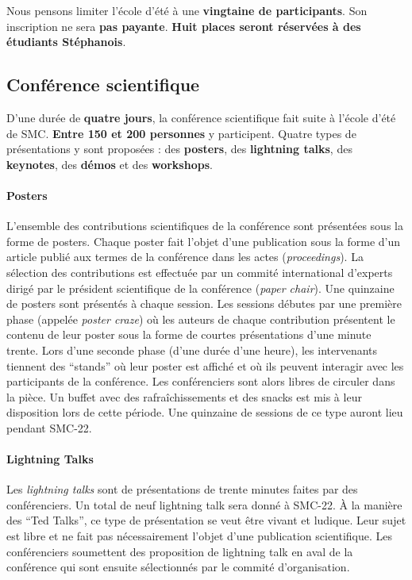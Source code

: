 \documentclass[fontsize=12pt]{scrartcl} %
\numberwithin{equation}{section} %
\numberwithin{figure}{section} %
\numberwithin{table}{section} %
\begin{document}
Nous pensons limiter l'école d'été à une \textbf{vingtaine de participants}. Son inscription ne sera \textbf{pas payante}. \textbf{Huit places seront réservées à des étudiants Stéphanois}. 

\subsection{Conférence scientifique}

D'une durée de \textbf{quatre jours}, la conférence scientifique fait suite à l'école d'été de SMC. \textbf{Entre 150 et 200 personnes} y participent. Quatre types de présentations y sont proposées : des \textbf{posters}, des \textbf{lightning talks}, des \textbf{keynotes}, des \textbf{démos} et des \textbf{workshops}. 

\paragraph{\textbf{Posters}} L'ensemble des contributions scientifiques de la conférence sont présentées sous la forme de posters. Chaque poster fait l'objet d'une publication sous la forme d'un article publié aux termes de la conférence dans les actes (\textit{proceedings}). La sélection des contributions est effectuée par un commité international d'experts dirigé par le président scientifique de la conférence (\textit{paper chair}). Une quinzaine de posters sont présentés à chaque session. Les sessions débutes par une première phase (appelée \textit{poster craze}) où les auteurs de chaque contribution présentent le contenu de leur poster sous la forme de courtes présentations d'une minute trente. Lors d'une seconde phase (d'une durée d'une heure), les intervenants tiennent des ``stands'' où leur poster est affiché et où ils peuvent interagir avec les participants de la conférence. Les conférenciers sont alors libres de circuler dans la pièce. Un buffet avec des rafraîchissements et des snacks est mis à leur disposition lors de cette période. Une quinzaine de sessions de ce type auront lieu pendant SMC-22.

\paragraph{\textbf{Lightning Talks}} Les \textit{lightning talks} sont de présentations de trente minutes faites par des conférenciers. Un total de neuf lightning talk sera donné à SMC-22. À la manière des ``Ted Talks'', ce type de présentation se veut être vivant et ludique. Leur sujet est libre et ne fait pas nécessairement l'objet d'une publication scientifique. Les conférenciers soumettent des proposition de lightning talk en aval de la conférence qui sont ensuite sélectionnés par le commité d'organisation. 
\end{document}
